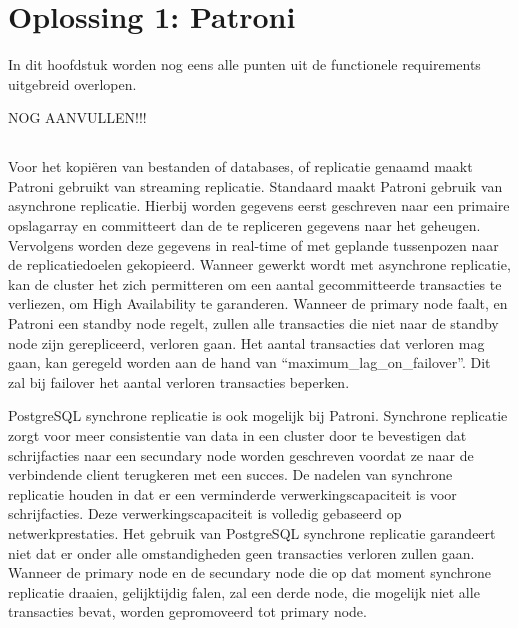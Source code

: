 
\chapter{Oplossing 1: Patroni}
\label{ch:Oplossing 1: Patroni}

In dit hoofdstuk worden nog eens alle punten uit de functionele requirements uitgebreid overlopen.

NOG AANVULLEN!!!




\section{}
\label{sec:Redundantie/Replicatie}

Voor het kopiëren van bestanden of databases, of replicatie genaamd maakt Patroni gebruikt van streaming replicatie. Standaard maakt Patroni gebruik van asynchrone replicatie. Hierbij worden gegevens eerst geschreven naar een primaire opslagarray en committeert dan de te repliceren gegevens naar het geheugen. Vervolgens worden deze gegevens in real-time of met geplande tussenpozen naar de replicatiedoelen gekopieerd.
Wanneer gewerkt wordt met asynchrone replicatie, kan de cluster het zich permitteren om een aantal gecommitteerde transacties te verliezen, om High Availability te garanderen. Wanneer de primary node faalt, en Patroni een standby node regelt, zullen alle transacties die niet naar de standby node zijn gerepliceerd, verloren gaan. Het aantal transacties dat verloren mag gaan, kan geregeld worden aan de hand van “maximum\_lag\_on\_failover”. Dit zal bij failover het aantal verloren transacties beperken.

PostgreSQL synchrone replicatie is ook mogelijk bij Patroni. Synchrone replicatie zorgt voor meer consistentie van data in een cluster door te bevestigen dat schrijfacties naar een secundary node worden geschreven voordat ze naar de verbindende client terugkeren met een succes. De nadelen van synchrone replicatie houden in dat er een verminderde verwerkingscapaciteit is voor schrijfacties. Deze verwerkingscapaciteit is volledig gebaseerd op netwerkprestaties. Het gebruik van PostgreSQL synchrone replicatie garandeert niet dat er onder alle omstandigheden geen transacties verloren zullen gaan. Wanneer de primary node en de secundary node die op dat moment synchrone replicatie draaien, gelijktijdig falen, zal een derde node, die mogelijk niet alle transacties bevat, worden gepromoveerd tot primary node.

